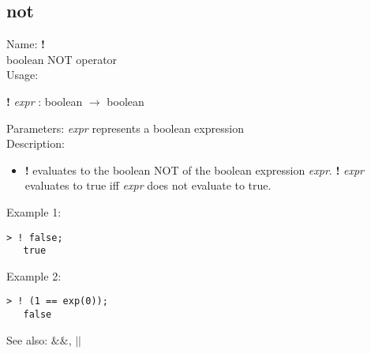 \subsection{ not }
\noindent Name: \textbf{!}\\
boolean NOT operator\\

\noindent Usage: 
\begin{center}
\textbf{!} \emph{expr} : \textsf{boolean} $\rightarrow$ \textsf{boolean}\\
\end{center}
Parameters: 
\emph{expr} represents a boolean expression\\

\noindent Description: \begin{itemize}

\item \textbf{!} evaluates to the boolean NOT of the boolean expression
   \emph{expr}. \textbf{!} \emph{expr} evaluates to true iff \emph{expr} does not evaluate
   to true.
\end{itemize}
\noindent Example 1: 
\begin{center}\begin{minipage}{14.8cm}\begin{Verbatim}[frame=single]
   > ! false;
   true
\end{Verbatim}
\end{minipage}\end{center}
\noindent Example 2: 
\begin{center}\begin{minipage}{14.8cm}\begin{Verbatim}[frame=single]
   > ! (1 == exp(0));
   false
\end{Verbatim}
\end{minipage}\end{center}
See also: \textbf{$\&\&$}, \textbf{$||$}
